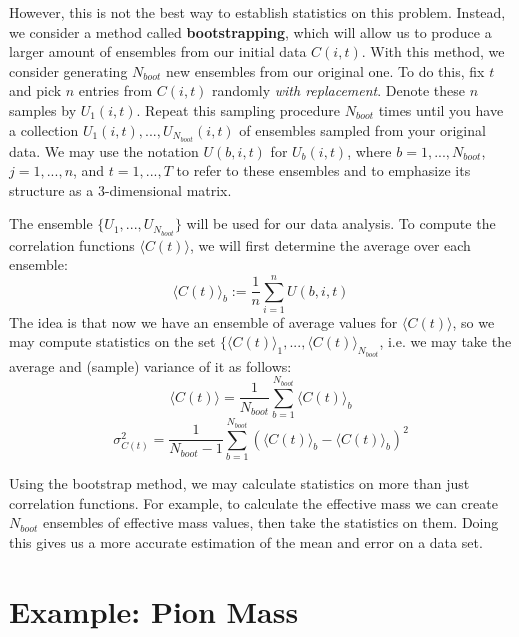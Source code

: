 \documentclass[11pt, oneside]{article}   	%
\theoremstyle{definition}
\begin{document}
However, this is not the best way to establish statistics on this problem. Instead, we consider a method 
called \textbf{bootstrapping}, which will allow us to produce a larger amount of ensembles from our 
initial data $C(i, t)$. With this method, we consider generating $N_{boot}$ new ensembles from our 
original one. To do this, fix $t$ and pick $n$ entries from $C(i, t)$ randomly \textit{with replacement}. 
Denote these $n$ samples by $U_1(i, t)$. Repeat this sampling procedure $N_{boot}$ times until 
you have a collection $U_1(i, t), ..., U_{N_{boot}}(i, t)$ of ensembles sampled from your original data. 
We may use the notation $U(b, i, t)$ for $U_b(i, t)$, where $b = 1, ..., N_{boot}$, $j = 1, ..., n$, and $t = 
1, ..., T$ to refer to these ensembles and to emphasize its structure as a 3-dimensional matrix. 

The ensemble $\{U_1, ..., U_{N_{boot}}\}$ will be used for our data analysis. To compute the correlation 
functions $\langle C(t)\rangle$, we will first determine the average over each ensemble:
\begin{equation}
	\langle C(t)\rangle_b := \frac{1}{n}\sum_{i = 1}^n U(b, i, t)
\end{equation}
The idea is that now we have an ensemble of average values for $\langle C(t)\rangle$, so we may compute 
statistics on the set $\{\langle C(t)\rangle_1, ..., \langle C(t)\rangle_{N_{boot}}$, i.e. we may take 
the average and (sample) variance of it as follows:
\begin{equation}
	\langle C(t)\rangle = \frac{1}{N_{boot}}\sum_{b = 1}^{N_{boot}}\langle C(t)\rangle_b
\end{equation}
\begin{equation}
	\sigma_{C(t)}^2 = \frac{1}{N_{boot} - 1}\sum_{b = 1}^{N_{boot}} (\langle C(t)\rangle_b - \langle C(t)
	\rangle_b)^2
\end{equation}

Using the bootstrap method, we may calculate statistics on more than just correlation functions. For example, 
to calculate the effective mass we can create $N_{boot}$ ensembles of effective mass values, then take the 
statistics on them. Doing this gives us a more accurate estimation of the mean and error on a data set.

\section{Example: Pion Mass}
\end{document}
